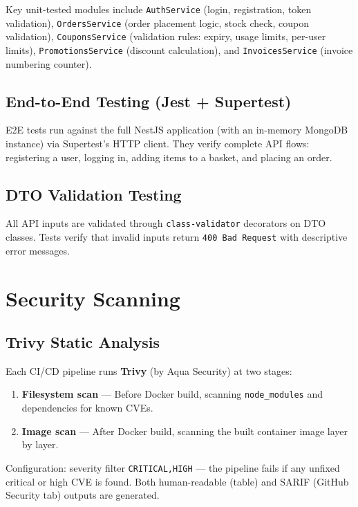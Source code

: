 Key unit-tested modules include \texttt{AuthService} (login, registration, token
validation), \texttt{OrdersService} (order placement logic, stock check, coupon
validation), \texttt{CouponsService} (validation rules: expiry, usage limits,
per-user limits), \texttt{PromotionsService} (discount calculation), and
\texttt{InvoicesService} (invoice numbering counter).

\subsection{End-to-End Testing (Jest + Supertest)}

E2E tests run against the full NestJS application (with an in-memory MongoDB instance)
via Supertest's HTTP client. They verify complete API flows: registering a user,
logging in, adding items to a basket, and placing an order.

\subsection{DTO Validation Testing}

All API inputs are validated through \texttt{class-validator} decorators on DTO
classes. Tests verify that invalid inputs return \texttt{400 Bad Request} with
descriptive error messages.

\section{Security Scanning}

\subsection{Trivy Static Analysis}

Each CI/CD pipeline runs \textbf{Trivy} (by Aqua Security) at two stages:

\begin{enumerate}
    \item \textbf{Filesystem scan} --- Before Docker build, scanning \texttt{node\_modules} and dependencies for known CVEs.
    \item \textbf{Image scan} --- After Docker build, scanning the built container image layer by layer.
\end{enumerate}

Configuration: severity filter \texttt{CRITICAL,HIGH} --- the pipeline fails if
any unfixed critical or high CVE is found. Both human-readable (table) and SARIF
(GitHub Security tab) outputs are generated.

